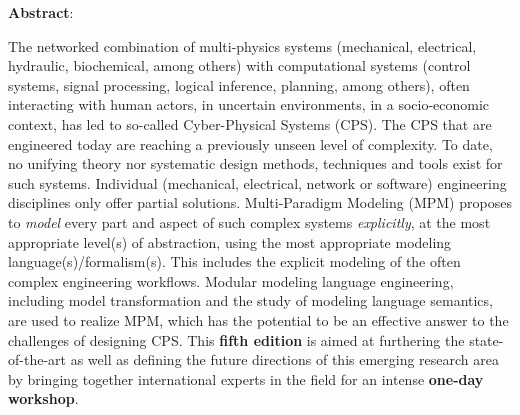 \documentclass[runningheads]{llncs}
\begin{document}
\noindent
\textbf{Abstract}: 
\begin{small}
The networked combination of multi-physics systems (mechanical, 
electrical, hydraulic, biochemical, among others) with computational systems 
(control systems, signal processing, logical inference, planning, among others), 
often interacting with human actors, in uncertain environments, in a socio-economic 
context, has led to so-called Cyber-Physical Systems (CPS).
%
The CPS that are engineered today are reaching a previously unseen level of 
complexity.
To date, no unifying theory nor systematic design methods, techniques and tools 
exist for such systems.
Individual (mechanical, electrical, network or software) engineering disciplines 
only offer partial solutions.
Multi-Paradigm Modeling (MPM) proposes to \emph{model} every part and aspect of 
such complex systems \emph{explicitly}, at the most appropriate level(s) of 
abstraction, using the most appropriate modeling language(s)/formalism(s).
This includes the explicit modeling of the often complex engineering workflows.
Modular modeling language engineering, including model transformation and the 
study of modeling language semantics, are used to realize MPM, which has the 
potential to be an effective answer to the challenges of designing CPS.
%
This \textbf{fifth edition} is aimed at furthering the state-of-the-art as well as 
defining the future directions of this emerging research area by bringing together 
international experts in the field for an intense \textbf{one-day workshop}.
\end{small}








\end{document}
